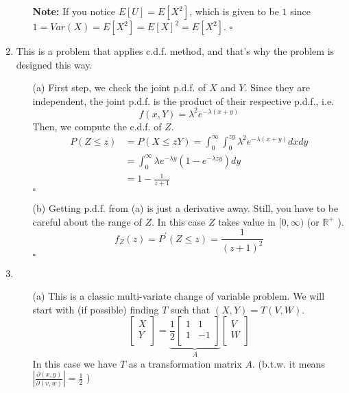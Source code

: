 \documentclass[12pt]{article}
\begin{document}
\begin{enumerate}
\begin{itemize}
    \textbf{Note:} If you notice \(E[U] = E[X^2]\), which is given to be \(1\) since \(1 = Var(X) = E[X^2] = E[X]^2 = E[X^2]\).     
    \hspace{\textwidth}\(\square \) 
\end{itemize}
\item This is a problem that applies c.d.f. method, and that's why the problem is designed this way. 
\begin{itemize}
    \item[(a)]
    First step, we check the joint p.d.f. of \(X\) and \(Y\). Since they are independent, the joint p.d.f. is the product of their respective p.d.f., i.e. 
    \[
        f(x,Y) = \lambda ^{2} e^{-\lambda (x+y)}
    \] 
    Then, we compute the c.d.f. of \(Z\).  
    \begin{equation*}
        \begin{aligned}
        P(Z \leq z ) &= P(X \leq zY) = \int_{0}^{\infty} \int_0^{zy}\lambda^{2} e^{-\lambda (x+y)}dxdy   
                \\ &= \int_0^{\infty} \lambda e^{- \lambda  y} (1-e^{-\lambda zy})dy 
                \\ &= 1  - \frac{1}{z+1}
        \end{aligned}
    \end{equation*}
    \hspace{\textwidth}\(\square \) 
    \item[(b)] 
    Getting p.d.f. from (a) is just a derivative away. Still, you have to be careful about the range of \(Z\). 
    In this case \(Z\) takes value in \([0,\infty )\) (or \(\mathbb{R}^+\) ).     
    \[
        f_Z(z) = P^\prime (Z \leq z) = \frac{1}{(z+1)^{2} }
    \]
    \hspace{\textwidth}\(\square \) 
\end{itemize}
\item 
\begin{itemize}
    \item[(a)] 
    This is a classic multi-variate change of variable problem. We will start with (if possible) finding \(T\) such that \((X,Y) = T(V,W)\). 
    \[
        \begin{bmatrix}
             X \\
             Y \\
        \end{bmatrix} = \underbrace{\frac{1}{2} \begin{bmatrix}
            1 &  1 \\
            1 &  -1 \\
        \end{bmatrix}}_{A}\begin{bmatrix}
             V \\
             W \\
        \end{bmatrix}
    \]
     In this case we have $T$ as a transformation matrix \(A\). (b.t.w. it means \(\left\vert \frac{\partial (x,y)}{\partial (v,w)} \right\vert  = \frac{1}{2}\) ) 
    

\end{itemize}
\end{enumerate}
\end{document}
